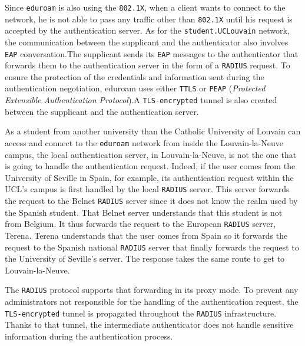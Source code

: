 Since \texttt{eduroam} is also using the \texttt{802.1X}, when a client wants to connect to the network, he is not able to pass any traffic other than \texttt{802.1X} until his request is accepted by the authentication server. As for the \texttt{student.UCLouvain} network, the communication between the supplicant and the authenticator also involves \texttt{EAP} conversation.The supplicant sends its \texttt{EAP} messages to the authenticator that forwards them to the authentication server in the form of a \texttt{RADIUS} request. To ensure the protection of the credentials and information sent during the authentication negotiation, eduroam uses either \texttt{TTLS} or \texttt{PEAP} (\textit{Protected Extensible Authentication Protocol}).A \texttt{TLS-encrypted} tunnel is also created between the supplicant and the authentication server.

As a student from another university than the Catholic University of Louvain can access and connect to the \texttt{eduroam} network from inside the Louvain-la-Neuve campus, the local authentication server, in Louvain-la-Neuve, is not the one that is going to handle the authentication request. Indeed, if the user comes from the University of Seville in Spain, for example, its authentication request within the UCL's campus is first handled by the local \texttt{RADIUS} server. This server forwards the request to the Belnet \texttt{RADIUS} server since it does not know the realm used by the Spanish student. That Belnet server understands that this student is not from Belgium. It thus forwards the request to the European \texttt{RADIUS} server, Terena. Terena understands that the user comes from Spain so it forwards the request to the Spanish national \texttt{RADIUS} server that finally forwards the request to the University of Seville's server. The response takes the same route to get to Louvain-la-Neuve.

The \texttt{RADIUS} protocol supports that forwarding in its proxy mode. To prevent any administrators not responsible for the handling of the authentication request, the \texttt{TLS-encrypted} tunnel is propagated throughout the \texttt{RADIUS} infrastructure. Thanks to that tunnel, the intermediate authenticator does not handle sensitive information during the authentication process.

